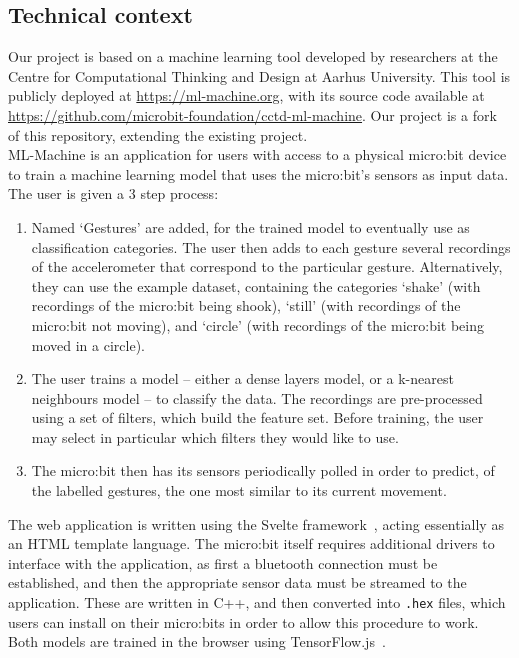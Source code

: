 \documentclass{article}
\begin{document}
\subsection{Technical context}%
\label{subsec:context}

Our project is based on a machine learning tool developed by researchers at the Centre for Computational Thinking and Design at Aarhus University. This tool is publicly deployed at \url{https://ml-machine.org}, with its source code available at \url{https://github.com/microbit-foundation/cctd-ml-machine}. Our project is a fork of this repository, extending the existing project. \\

ML-Machine is an application for users with access to a physical micro:bit device to train a machine learning model that uses the micro:bit's sensors as input data. The user is given a 3 step process:
\begin{enumerate}
        \item Named `Gestures' are added, for the trained model to eventually use as classification categories. The user then adds to each gesture several recordings of the accelerometer that correspond to the particular gesture. Alternatively, they can use the example dataset, containing the categories `shake' (with recordings of the micro:bit being shook), `still' (with recordings of the micro:bit not moving), and `circle' (with recordings of the micro:bit being moved in a circle).
  \item The user trains a model -- either a dense layers model, or a k-nearest neighbours model -- to classify the data. The recordings are pre-processed using a set of filters, which build the feature set. Before training, the user may select in particular which filters they would like to use.
        \item The micro:bit then has its sensors periodically polled in order to predict, of the labelled gestures, the one most similar to its current movement.
\end{enumerate}

The web application is written using the Svelte framework~\cite{svelte}, acting essentially as an HTML template language. The micro:bit itself requires additional drivers to interface with the application, as first a bluetooth connection must be established, and then the appropriate sensor data must be streamed to the application. These are written in C++, and then converted into \verb|.hex| files, which users can install on their micro:bits in order to allow this procedure to work. Both models are trained in the browser using TensorFlow.js~\cite{tensorflowjs}. \\
\end{document}

